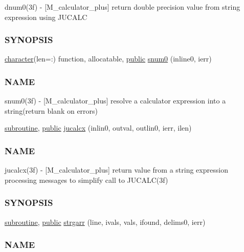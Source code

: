 \begin{DoxyCompactItemize}
\begin{DoxyCompactList}
dnum0(3f) -\/ \mbox{[}M\+\_\+calculator\+\_\+plus\mbox{]} return double precision value from string expression using J\+U\+C\+A\+LC \subsubsection*{S\+Y\+N\+O\+P\+S\+IS}\end{DoxyCompactList}\item 
\hyperlink{option__stopwatch_83_8txt_abd4b21fbbd175834027b5224bfe97e66}{character}(len=\+:) function, allocatable, \hyperlink{M__stopwatch_83_8txt_a2f74811300c361e53b430611a7d1769f}{public} \hyperlink{namespacem__calculator__plus_a2538e7f9f0b810f7f8dbdd80fa2444b3}{snum0} (inline0, ierr)
\begin{DoxyCompactList}\small\item\em \subsubsection*{N\+A\+ME}

snum0(3f) -\/ \mbox{[}M\+\_\+calculator\+\_\+plus\mbox{]} resolve a calculator expression into a string(return blank on errors) \end{DoxyCompactList}\item 
\hyperlink{M__stopwatch_83_8txt_acfbcff50169d691ff02d4a123ed70482}{subroutine}, \hyperlink{M__stopwatch_83_8txt_a2f74811300c361e53b430611a7d1769f}{public} \hyperlink{namespacem__calculator__plus_a558a3fed7079c10085ce2f71da532d08}{jucalcx} (inlin0, outval, outlin0, ierr, ilen)
\begin{DoxyCompactList}\small\item\em \subsubsection*{N\+A\+ME}

jucalcx(3f) -\/ \mbox{[}M\+\_\+calculator\+\_\+plus\mbox{]} return value from a string expression processing messages to simplify call to J\+U\+C\+A\+L\+C(3f) \subsubsection*{S\+Y\+N\+O\+P\+S\+IS}\end{DoxyCompactList}\item 
\hyperlink{M__stopwatch_83_8txt_acfbcff50169d691ff02d4a123ed70482}{subroutine}, \hyperlink{M__stopwatch_83_8txt_a2f74811300c361e53b430611a7d1769f}{public} \hyperlink{namespacem__calculator__plus_a4d3424e0cb74d4af53e7f59c07d31f1b}{strgarr} (line, ivals, vals, ifound, delims0, ierr)
\begin{DoxyCompactList}\small\item\em \subsubsection*{N\+A\+ME}


\end{DoxyCompactList}
\end{DoxyCompactItemize}
